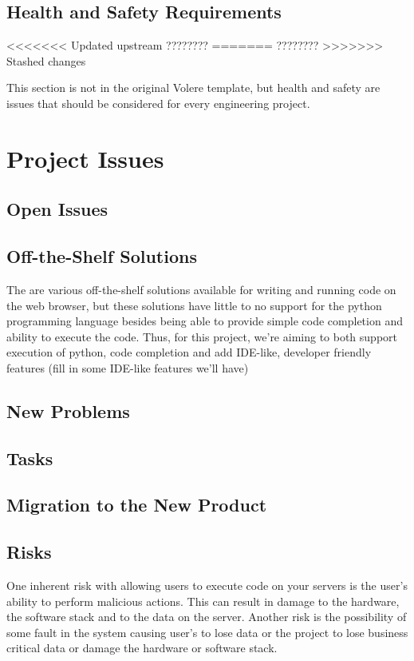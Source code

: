 \documentclass[12pt, titlepage]{article}
\begin{document}
  \subsection{Health and Safety Requirements}
<<<<<<< Updated upstream
  {\huge ????????}
=======
  \Huge ????????
>>>>>>> Stashed changes

  This section is not in the original Volere template, but health and safety are
  issues that should be considered for every engineering project.

\section{Project Issues}

  \subsection{Open Issues}

  \subsection{Off-the-Shelf Solutions}
  The are various off-the-shelf solutions available for writing and running
  code on the web browser, but these solutions have little to no support for
  the python programming language besides being able to provide simple code
  completion and ability to execute the code. Thus, for this project, we're
  aiming to both support execution of python, code completion and add IDE-like,
  developer friendly features ({\Huge fill in some IDE-like features we'll
  have})

  \subsection{New Problems}

  \subsection{Tasks}

  \subsection{Migration to the New Product}

  \subsection{Risks}
  One inherent risk with allowing users to execute code on your servers is the
  user's ability to perform malicious actions. This can result in damage to the
  hardware, the software stack and to the data on the server.  Another risk is
  the possibility of some fault in the system causing user's to lose data or
  the project to lose business critical data or damage the hardware or software
  stack.
\end{document}
